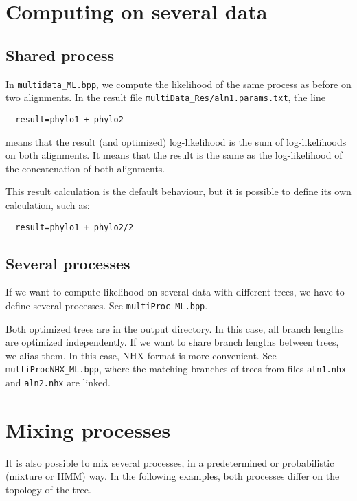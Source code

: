 \documentclass{article}
\begin{document}
\section{Computing on several data}

\subsection{Shared process}

In \verb#multidata_ML.bpp#, we compute the likelihood of the same
process as before on two alignments. 
In the result file \verb#multiData_Res/aln1.params.txt#, the line

\begin{verbatim}
  result=phylo1 + phylo2
\end{verbatim}

means that the result (and optimized) log-likelihood is the sum of
log-likelihoods on both alignments. It means that the result is the
same as the log-likelihood of the concatenation of both alignments.

This result calculation is the default behaviour, but it is possible
to define its own calculation, such as: 

\begin{verbatim}
  result=phylo1 + phylo2/2
\end{verbatim}

\subsection{Several processes}

If we want to compute likelihood on several data with different trees,
we have to define several processes. See \verb#multiProc_ML.bpp#.

Both optimized trees are in the output directory. In this case, all
branch lengths are optimized independently. If we want to share branch
lengths between trees, we alias them. In this case, NHX format is more
convenient. See \verb#multiProcNHX_ML.bpp#, where the matching
branches of trees from files \verb#aln1.nhx# and \verb#aln2.nhx# are
linked. 

\section{Mixing processes}

It is also possible to mix several processes, in a predetermined or
probabilistic (mixture or HMM) way. In the following examples, both
processes differ on the topology of the tree.
\end{document}
